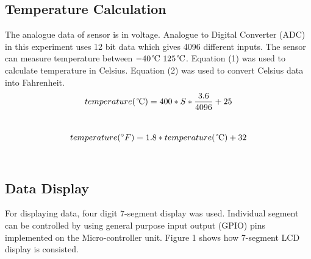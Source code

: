 \documentclass{article}
\begin{document}
\subsection{Temperature Calculation}
The analogue data of sensor is in voltage. Analogue to Digital Converter (ADC) in this experiment uses 12 bit data which gives 4096 different inputs. The sensor can measure temperature between \(-40\, \celsius ~ 125\, \celsius \). Equation (1) was used to calculate temperature in Celsius. Equation (2) was used to convert Celsius data into Fahrenheit.\\
\begin{equation}
temperature(\, \celsius) = 400*S*\frac{3.6}{4096} + 25
\end{equation}\\
\begin{equation}
temperature(^{\circ}F) = 1.8*temperature(\, \celsius) + 32
\end{equation}\\
\subsection{Data Display}
For displaying data, four digit 7-segment display was used. Individual segment can be controlled by using general purpose input output (GPIO) pins implemented on the Micro-controller unit. Figure 1 shows how 7-segment LCD display is consisted.
\end{document}

